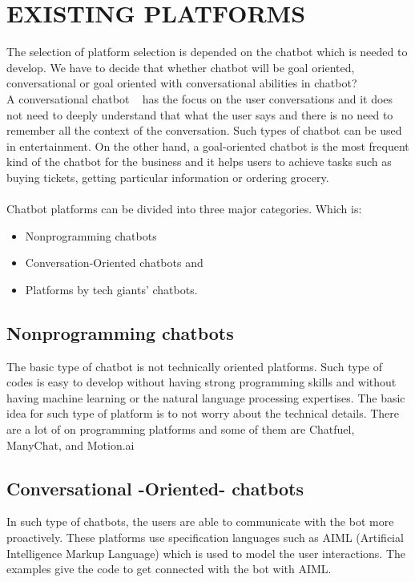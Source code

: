 \documentclass[conference]{IEEEtran}
\begin{document}
\section{EXISTING PLATFORMS}
The selection of platform selection is depended on the chatbot which is needed to develop. We have to decide that whether chatbot will be goal oriented, conversational or goal oriented with conversational abilities in chatbot?\\
A conversational chatbot ~\cite{b9} has the focus on the user conversations and it does not need to deeply understand that what the user says and there is no need to remember all the context of the conversation. Such types of chatbot can be used in entertainment. On the other hand, a goal-oriented chatbot is the most frequent kind of the chatbot for the business and it helps users to achieve tasks such as buying tickets, getting particular information or ordering grocery.\\\\
Chatbot platforms can be divided into three major categories. Which is:
\begin{itemize}
  \item Nonprogramming chatbots
  \item Conversation-Oriented chatbots and
  \item Platforms by tech giants' chatbots.
\end{itemize}

\subsection{Nonprogramming chatbots}\label{AA}
The basic type of chatbot is not technically oriented platforms. Such type of codes is easy to develop without having strong programming skills and without having machine learning or the natural language processing expertises. The basic idea for such type of platform is to not worry about the technical details. There are a lot of on programming platforms and some of them are Chatfuel, ManyChat, and Motion.ai

\subsection{Conversational -Oriented- chatbots}
In such type of chatbots, the users are able to communicate with the bot more proactively. These platforms use specification languages such as AIML (Artificial Intelligence Markup Language) which is used to model the user interactions. The examples give the code to get connected with the bot with AIML.
\end{document}
